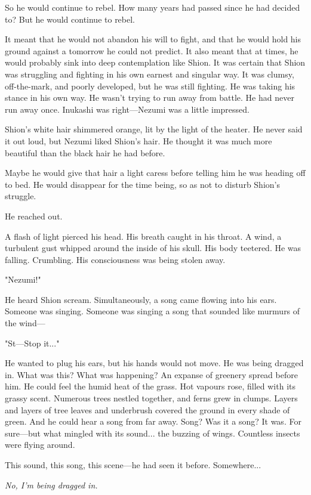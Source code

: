 So he would continue to rebel. How many years had passed since he had
decided to? But he would continue to rebel.

It meant that he would not abandon his will to fight, and that he would
hold his ground against a tomorrow he could not predict. It also meant
that at times, he would probably sink into deep contemplation like
Shion. It was certain that Shion was struggling and fighting in his own
earnest and singular way. It was clumsy, off-the-mark, and poorly
developed, but he was still fighting. He was taking his stance in his
own way. He wasn't trying to run away from battle. He had never run away
once. Inukashi was right---Nezumi was a little impressed.

Shion's white hair shimmered orange, lit by the light of the heater. He
never said it out loud, but Nezumi liked Shion's hair. He thought it was
much more beautiful than the black hair he had before.

Maybe he would give that hair a light caress before telling him he was
heading off to bed. He would disappear for the time being, so as not to
disturb Shion's struggle.

He reached out.

A flash of light pierced his head. His breath caught in his throat. A
wind, a turbulent gust whipped around the inside of his skull. His body
teetered. He was falling. Crumbling. His consciousness was being stolen
away.

"Nezumi!"

He heard Shion scream. Simultaneously, a song came flowing into his
ears. Someone was singing. Someone was singing a song that sounded like
murmurs of the wind---

"St---Stop it..."

He wanted to plug his ears, but his hands would not move. He was being
dragged in. What was this? What was happening? An expanse of greenery
spread before him. He could feel the humid heat of the grass. Hot
vapours rose, filled with its grassy scent. Numerous trees nestled
together, and ferns grew in clumps. Layers and layers of tree leaves and
underbrush covered the ground in every shade of green. And he could hear
a song from far away. Song? Was it a song? It was. For sure---but what
mingled with its sound... the buzzing of wings. Countless insects were
flying around.

This sound, this song, this scene---he had seen it before. Somewhere...

\emph{No, I'm being dragged in.}

